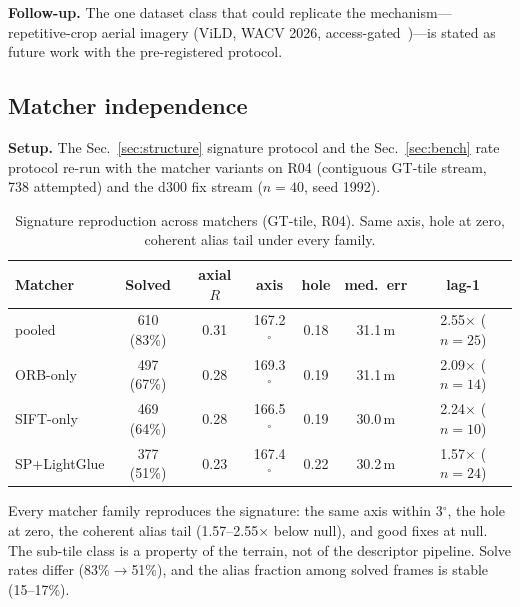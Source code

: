 \documentclass[journal]{IEEEtran}
\begin{document}
\textbf{Follow-up.} The one dataset class that could replicate the mechanism---repetitive-crop aerial imagery (ViLD, WACV 2026, access-gated~\cite{vild})---is stated as future work with the pre-registered protocol.

\subsection{Matcher independence}
\label{sec:matcher}

\textbf{Setup.} The Sec.~\ref{sec:structure} signature protocol and the Sec.~\ref{sec:bench} rate protocol re-run with the matcher variants on R04 (contiguous GT-tile stream, 738 attempted) and the d300 fix stream ($n=40$, seed 1992).

\begin{table}[t]
\caption{Signature reproduction across matchers (GT-tile, R04). Same axis, hole at zero, coherent alias tail under every family.}
\label{tab:matchersig}
\centering
\footnotesize
\setlength{\tabcolsep}{2.5pt}
\begin{tabular}{@{}lcccccc@{}}
\toprule
Matcher & Solved & axial $R$ & axis & hole & med.\ err & lag-1 \\
\midrule
pooled & 610 (83\%) & 0.31 & 167.2$^{\circ}$ & 0.18 & 31.1\,m & 2.55$\times$ ($n{=}25$) \\
ORB-only & 497 (67\%) & 0.28 & 169.3$^{\circ}$ & 0.19 & 31.1\,m & 2.09$\times$ ($n{=}14$) \\
SIFT-only & 469 (64\%) & 0.28 & 166.5$^{\circ}$ & 0.19 & 30.0\,m & 2.24$\times$ ($n{=}10$) \\
SP+LightGlue & 377 (51\%) & 0.23 & 167.4$^{\circ}$ & 0.22 & 30.2\,m & 1.57$\times$ ($n{=}24$) \\
\bottomrule
\end{tabular}
\end{table}

Every matcher family reproduces the signature: the same axis within 3$^{\circ}$, the hole at zero, the coherent alias tail (1.57--2.55$\times$ below null), and good fixes at null. The sub-tile class is a property of the terrain, not of the descriptor pipeline. Solve rates differ (83\%$\to$51\%), and the alias fraction among solved frames is stable (15--17\%).
\end{document}
